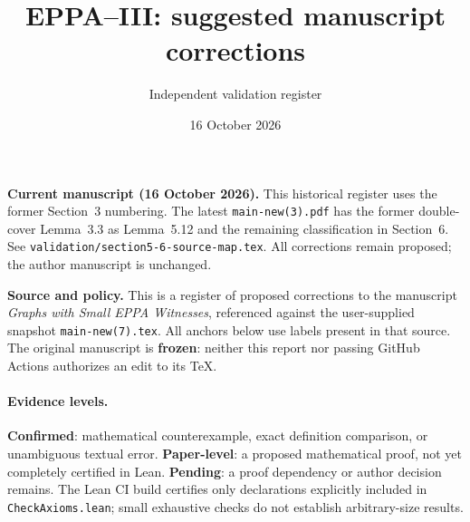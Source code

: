 \documentclass[11pt,a4paper]{article}
\title{EPPA--III: suggested manuscript corrections}
\author{Independent validation register}
\date{16 October 2026}
\begin{document}
\maketitle

\noindent\textbf{Current manuscript (16 October 2026).}
This historical register uses the former Section~3 numbering.
The latest \texttt{main-new(3).pdf} has the former double-cover
Lemma~3.3 as Lemma~5.12 and the remaining classification in Section~6.
See \texttt{validation/section5-6-source-map.tex}.
All corrections remain proposed; the author manuscript is unchanged.



\noindent\textbf{Source and policy.}
This is a register of proposed corrections to the manuscript
\emph{Graphs with Small EPPA Witnesses}, referenced against the
user-supplied snapshot \texttt{main-new(7).tex}.
All anchors below use labels present in that source.
The original manuscript is \textbf{frozen}: neither this report nor
passing GitHub Actions authorizes an edit to its TeX.

\paragraph{Evidence levels.}
\textbf{Confirmed}: mathematical counterexample, exact definition
comparison, or unambiguous textual error.
\textbf{Paper-level}: a proposed mathematical proof, not yet
completely certified in Lean.
\textbf{Pending}: a proof dependency or author decision remains.
The Lean CI build certifies only declarations explicitly included
in \texttt{CheckAxioms.lean}; small exhaustive checks do not
establish arbitrary-size results.
\end{document}
